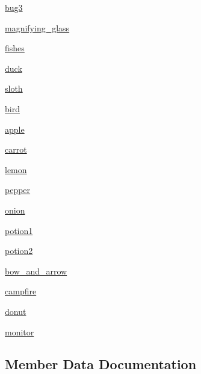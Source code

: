 \begin{DoxyCompactItemize}
\hyperlink{enumbridges_1_1base_1_1_named_symbol_ac9258f17b894fcb09171cd4e62d72364}{bug3}
\item 
\hyperlink{enumbridges_1_1base_1_1_named_symbol_abaf4dec18e031543a69411a7b2776ca1}{magnifying\+\_\+glass}
\item 
\hyperlink{enumbridges_1_1base_1_1_named_symbol_a64d1a15ef25a1a52bff5bd096cd7f70e}{fishes}
\item 
\hyperlink{enumbridges_1_1base_1_1_named_symbol_a8dd44f6927686e5205e8827b5eafcf6b}{duck}
\item 
\hyperlink{enumbridges_1_1base_1_1_named_symbol_ab8ffedf44afbef7c8d5afedb4586096b}{sloth}
\item 
\hyperlink{enumbridges_1_1base_1_1_named_symbol_a93e3b5d80c43b5942f9a30026a587d2f}{bird}
\item 
\hyperlink{enumbridges_1_1base_1_1_named_symbol_abed22f9f9bc8e1859413013dce8a2b82}{apple}
\item 
\hyperlink{enumbridges_1_1base_1_1_named_symbol_aca2bf6ca871e6a0feaf7a1d1f20418ea}{carrot}
\item 
\hyperlink{enumbridges_1_1base_1_1_named_symbol_add585836d35314cd6592078cb40f457a}{lemon}
\item 
\hyperlink{enumbridges_1_1base_1_1_named_symbol_aa0bef5409efd78e832343394fc609ee2}{pepper}
\item 
\hyperlink{enumbridges_1_1base_1_1_named_symbol_aa0f4bae18cb6ad877518663c24db8fbb}{onion}
\item 
\hyperlink{enumbridges_1_1base_1_1_named_symbol_a2d110f2479bb2f6c18b707a8c2c79af7}{potion1}
\item 
\hyperlink{enumbridges_1_1base_1_1_named_symbol_ab0e8b05605cf8fad61c9f335f93a747b}{potion2}
\item 
\hyperlink{enumbridges_1_1base_1_1_named_symbol_a3eb2b98a62e8948c289e1e56d041df5a}{bow\+\_\+and\+\_\+arrow}
\item 
\hyperlink{enumbridges_1_1base_1_1_named_symbol_a9f5480d4dcbf98f700cf583e1cab6b6d}{campfire}
\item 
\hyperlink{enumbridges_1_1base_1_1_named_symbol_ae77db709a676ecb5e20b85fee13f9b88}{donut}
\item 
\hyperlink{enumbridges_1_1base_1_1_named_symbol_ae2f20180db9fea28a631233db2492adb}{monitor}
\end{DoxyCompactItemize}


\subsection{Member Data Documentation}
\mbox{\label{enumbridges_1_1base_1_1_named_symbol_ae27d65e6f49061a4ddb2d9861fe7a0aa}} 
